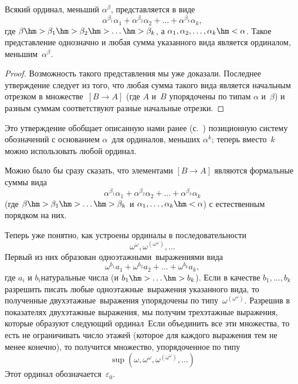 \begin{theorem}
Всякий ординал, меньший $\alpha^\beta$, представляется в
виде
        $$
\alpha^{\beta_1}\alpha_1 + \alpha^{\beta_2}\alpha_2+\ldots+
\alpha^{\beta_k}\alpha_k,
        $$
где $\beta\hm>\beta_1\hm>\beta_2\hm>\ldots\hm>\beta_k$,
а $\alpha_1,\alpha_2,\dots,\alpha_k\hm<\alpha$.
Такое представление однозначно и любая сумма указанного вида
является ординалом, меньшим~$\alpha^\beta$.
\end{theorem}

\begin{proof}
Возможность такого представления мы уже доказали. Последнее
утверждение следует из того, что любая сумма такого вида
является начальным отрезком в множестве~$[B\to A]$ (где $A$
и~$B$ упорядочены по типам $\alpha$ и~$\beta$) и разным
суммам соответствуют разные начальные отрезки.
\end{proof}

Это утверждение обобщает описанную нами ранее
(с.~\pageref{position-ordinal-system})  позиционную систему%
обозначений с основанием $\alpha$\ для ординалов, меньших
$\alpha^k$; теперь вместо~$k$ можно использовать любой ординал.

Можно было бы сразу сказать, что элементами
$[B\to A]$
являются формальные суммы вида
        $$
\alpha^{\beta_1}\alpha_1 + \alpha^{\beta_2}\alpha_2+\ldots+
\alpha^{\beta_k}\alpha_k
        $$
(где $\beta\hm>\beta_1\hm>\ldots\hm>\beta_k$ и
$\alpha_1,\dots,\alpha_k\hm<\alpha$) с естественным порядком на них.

Теперь уже понятно, как устроены ординалы в последовательности
        $$
\omega^\omega, \omega^{(\omega^\omega)},\ldots
        $$
Первый из них образован  одноэтажными\
выражениями вида
        $$
\omega^{b_1}a_1 + \omega^{b_2}a_2+\ldots+
\omega^{b_k}a_k,
        $$
где $a_i$ и $b_i$\т натуральные числа (и $b_1\hm>\dots\hm>b_k$).
Если в качестве
$b_1, \dots, b_k$ разрешить писать любые  одноэтажные\
выражения указанного вида, то полученные  двухэтажные\ выражения
упорядочены по типу~$\omega^{(\omega^\omega)}$. Разрешив в показателях
двухэтажные выражения, мы получим трехэтажные выражения, которые образуют
следующий ординал~\итд  Если объединить все эти множества, то есть не
ограничивать число этажей (которое для каждого выражения тем не
менее конечно), то получится множество, упорядоченное по типу
        $$
\sup(\omega, \omega^\omega, \omega^{(\omega^\omega)},\ldots)
        $$
Этот ординал обозначается~$\varepsilon_0$.

